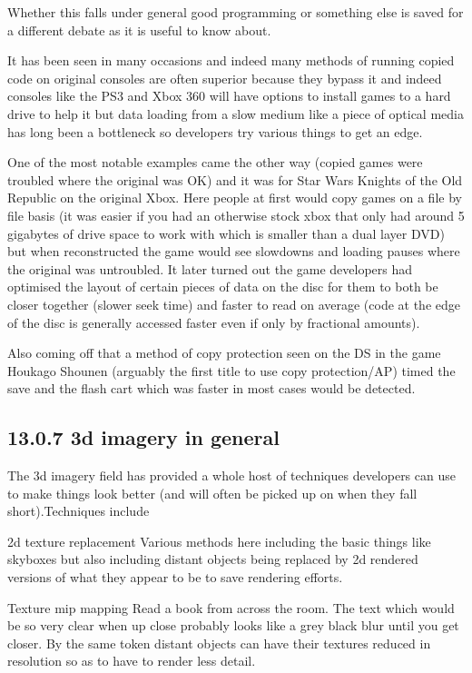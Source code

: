 \documentclass[
]{book}
\begin{document}
Whether this falls under general good programming or something else is saved for a different debate as it is useful to know about.

It has been seen in many occasions and indeed many methods of running copied code on original consoles are often superior because they bypass it and indeed consoles like the PS3 and Xbox 360 will have options to install games to a hard drive to help it but data loading from a slow medium like a piece of optical media has long been a bottleneck so developers try various things to get an edge.

One of the most notable examples came the other way (copied games were troubled where the original was OK) and it was for Star Wars Knights of the Old Republic on the original Xbox. Here people at first would copy games on a file by file basis (it was easier if you had an otherwise stock xbox that only had around 5 gigabytes of drive space to work with which is smaller than a dual layer DVD) but when reconstructed the game would see slowdowns and loading pauses where the original was untroubled. It later turned out the game developers had optimised the layout of certain pieces of data on the disc for them to both be closer together (slower seek time) and faster to read on average (code at the edge of the disc is generally accessed faster even if only by fractional amounts).

Also coming off that a method of copy protection seen on the DS in the game Houkago Shounen (arguably the first title to use copy protection/AP) timed the save and the flash cart which was faster in most cases would be detected.

\hypertarget{d-imagery-in-general}{%
\subsection{13.0.7 3d imagery in general}\label{d-imagery-in-general}}

The 3d imagery field has provided a whole host of techniques developers can use to make things look better (and will often be picked up on when they fall short).Techniques include

2d texture replacement Various methods here including the basic things like skyboxes but also including distant objects being replaced by 2d rendered versions of what they appear to be to save rendering efforts.

Texture mip mapping Read a book from across the room. The text which would be so very clear when up close probably looks like a grey black blur until you get closer. By the same token distant objects can have their textures reduced in resolution so as to have to render less detail.
\end{document}
